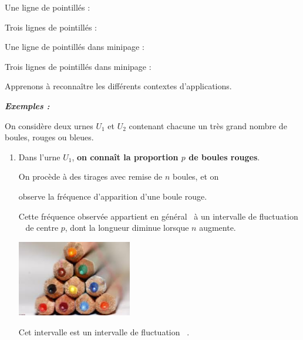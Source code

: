 \begin{spacing}{1.2}
Une ligne de pointillés :

\Pointilles

Trois lignes de pointillés :

\Pointilles[3]

\begin{minipage}{0.45\linewidth}

Une ligne de pointillés dans minipage :
\Pointilles

\end{minipage}
\hfill
\begin{minipage}{0.45\linewidth}

Trois lignes de pointillés dans minipage :
\Pointilles[3]

\end{minipage}

Apprenons à reconnaître les différents contextes d'applications.

\medskip


\textbf{\textit{Exemples :}}

On considère deux urnes $U_1$ et $U_2$ contenant chacune un très grand nombre de boules, rouges ou bleues.

\begin{enumerate}
\item 
Dans l'urne $U_1$, \textbf{on connaît la proportion $p$ de boules rouges}.

\begin{minipage}{0.45\linewidth}
On procède à des tirages avec remise de $n$ boules, et on 

observe la fréquence d'apparition d'une boule rouge.

Cette fréquence observée appartient \og en général\fg~ à un \og intervalle de fluctuation \fg~ de centre $p$, dont la longueur diminue lorsque $n$ augmente.

\end{minipage}
\hfill
\begin{minipage}{0.45\linewidth}
\includegraphics[width=5cm]{fig.eps}

\end{minipage}


Cet intervalle est un \og intervalle de fluctuation \fg~.


\end{enumerate}
\end{spacing}
